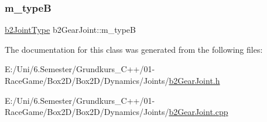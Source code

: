 \mbox{\label{classb2_gear_joint_a03e1959e04a361db79ae5da5ba76379e}} 
\subsubsection{\texorpdfstring{m\_typeB}{m\_typeB}}
{\footnotesize\ttfamily \mbox{\hyperlink{b2_joint_8h_a0bb202d8a286c888a11985b07b2272ab}{b2\+Joint\+Type}} b2\+Gear\+Joint\+::m\+\_\+typeB\hspace{0.3cm}{\ttfamily [protected]}}



The documentation for this class was generated from the following files\+:\begin{DoxyCompactItemize}
\item 
E\+:/\+Uni/6.\+Semester/\+Grundkurs\+\_\+\+C++/01-\/\+Race\+Game/\+Box2\+D/\+Box2\+D/\+Dynamics/\+Joints/\mbox{\hyperlink{b2_gear_joint_8h}{b2\+Gear\+Joint.\+h}}\item 
E\+:/\+Uni/6.\+Semester/\+Grundkurs\+\_\+\+C++/01-\/\+Race\+Game/\+Box2\+D/\+Box2\+D/\+Dynamics/\+Joints/\mbox{\hyperlink{b2_gear_joint_8cpp}{b2\+Gear\+Joint.\+cpp}}\end{DoxyCompactItemize}
